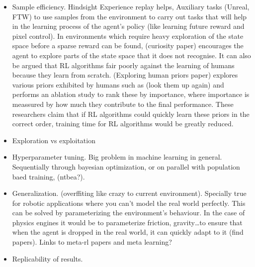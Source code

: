 \documentclass{../main.tex}{subfiles}
\begin{document}
\begin{itemize}
    \item Sample efficiency. Hindsight Experience replay helps, Auxiliary tasks (Unreal, FTW) to use samples from the environment to carry out tasks that will help in the learning process of the agent's policy (like learning future reward and pixel control). In environments which require heavy exploration of the state space before a sparse reward can be found, (curiosity paper) encourages the agent to explore parts of the state space that it does not recognise. It can also be argued that RL algorithms fair poorly against the learning of humans because they learn from scratch. (Exploring human priors paper) explores various priors exhibited by humans such as (look them up again) and performs an ablation study to rank these by importance, where importance is meassured by how much they contribute to the final performance. These researchers claim that if  RL algorithms could quickly learn these priors in the correct order, training time for RL algorithms would be greatly reduced.
    \item Exploration vs exploitation
    \item Hyperparameter tuning. Big problem in machine learning in general. Sequentially through bayesian optimization, or on parallel with population baed training, (ntbea?). 
    \item Generalization. (overffiting like crazy to current environment). Specially true for robotic applications where you can't model the real world perfectly. This can be solved by parameterizing the environment's behaviour. In the case of physics engines it would be to parameterize friction, gravity\ldots to ensure that when the agent is dropped in the real world, it can quickly adapt to it (find papers). Links to meta-rl papers and meta learning?
    \item Replicability of results.
\end{itemize}
\end{document}
